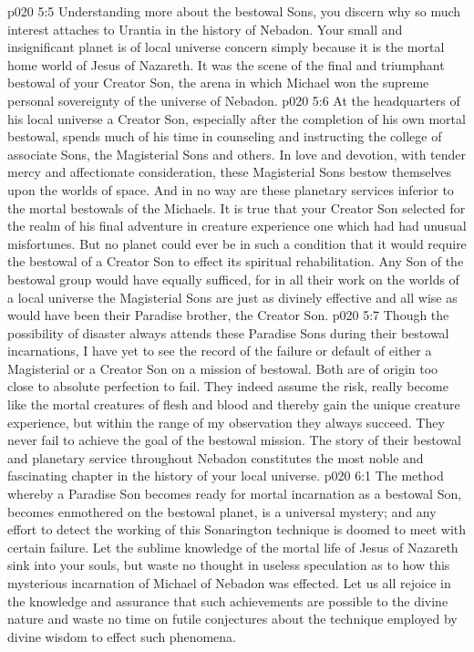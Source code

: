 \vs p020 5:5 \pc Understanding more about the bestowal Sons, you discern why so much interest attaches to Urantia in the history of Nebadon. Your small and insignificant planet is of local universe concern simply because it is the mortal home world of Jesus of Nazareth. It was the scene of the final and triumphant bestowal of your Creator Son, the arena in which Michael won the supreme personal sovereignty of the universe of Nebadon.
\vs p020 5:6 At the headquarters of his local universe a Creator Son, especially after the completion of his own mortal bestowal, spends much of his time in counseling and instructing the college of associate Sons, the Magisterial Sons and others. In love and devotion, with tender mercy and affectionate consideration, these Magisterial Sons bestow themselves upon the worlds of space. And in no way are these planetary services inferior to the mortal bestowals of the Michaels. It is true that your Creator Son selected for the realm of his final adventure in creature experience one which had had unusual misfortunes. But no planet could ever be in such a condition that it would require the bestowal of a Creator Son to effect its spiritual rehabilitation. Any Son of the bestowal group would have equally sufficed, for in all their work on the worlds of a local universe the Magisterial Sons are just as divinely effective and all wise as would have been their Paradise brother, the Creator Son.
\vs p020 5:7 \pc Though the possibility of disaster always attends these Paradise Sons during their bestowal incarnations, I have yet to see the record of the failure or default of either a Magisterial or a Creator Son on a mission of bestowal. Both are of origin too close to absolute perfection to fail. They indeed assume the risk, really become like the mortal creatures of flesh and blood and thereby gain the unique creature experience, but within the range of my observation they always succeed. They never fail to achieve the goal of the bestowal mission. The story of their bestowal and planetary service throughout Nebadon constitutes the most noble and fascinating chapter in the history of your local universe.
\vs p020 6:1 The method whereby a Paradise Son becomes ready for mortal incarnation as a bestowal Son, becomes enmothered on the bestowal planet, is a universal mystery; and any effort to detect the working of this Sonarington technique is doomed to meet with certain failure. Let the sublime knowledge of the mortal life of Jesus of Nazareth sink into your souls, but waste no thought in useless speculation as to how this mysterious incarnation of Michael of Nebadon was effected. Let us all rejoice in the knowledge and assurance that such achievements are possible to the divine nature and waste no time on futile conjectures about the technique employed by divine wisdom to effect such phenomena.
